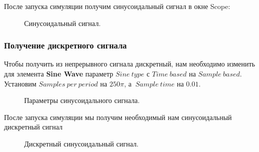 \documentclass[a4paper,14pt]{extarticle}
\begin{document}
После запуска симуляции получим синусоидальный сигнал в окне Scope:

\begin{figure}[H]
\caption{Синусоидальный сигнал.}
\label{007}
\end{figure}

\subsubsection{Получение дискретного сигнала}

Чтобы получить из непрерывного сигнала дискретный, нам необходимо изменить для элемента \textbf{Sine Wave} параметр $Sine \ type$ с $Time \ based$ на $Sample \ based$. Установим $Samples \ per \ period$ на $250\pi$, а $\ Sample \ time$ на $0.01$.

\begin{figure}[H]
\caption{Параметры синусоидального сигнала.}
\label{009a}
\end{figure}

После запуска симуляции мы получим необходимый нам синусоидальный дискретный сигнал

\begin{figure}[H]
\caption{Дискретный синусоидальный сигнал.}
\label{010}
\end{figure}
\end{document}
